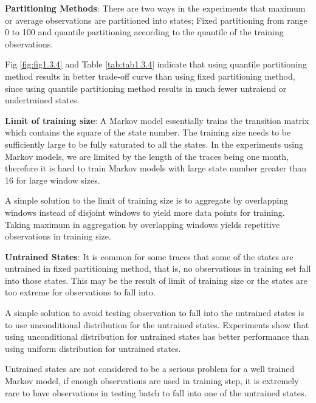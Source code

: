 \documentclass{article}
\begin{document}
\begin{flushleft}
\textbf{Partitioning Methods}: There are two ways in the experiments that
maximum or average observations are partitioned into states; Fixed partitioning
from range 0 to 100 and quantile partitioning according to the quantile of the
training observations. 

Fig \ref{fig:fig1.3.4} and Table \ref{tab:tab1.3.4} indicate that using quantile
partitioning method results in better trade-off curve than using fixed
partitioning method, since using quantile partitioning method results in much
fewer untraiend or undertrained states.
\end{flushleft}

\begin{flushleft}
  \textbf{Limit of training size}: A Markov model essentially trains the
  transition matrix which contains the square of the state number. The training
  size needs to be sufficiently large to be fully saturated to all the states.
  In the experiments using Markov models, we are limited by the length of the
  traces being one month, therefore it is hard to train Markov models with large
  state number greater than 16 for large window sizes.
  
  A simple solution to the limit of training size is to aggregate by overlapping
  windows instead of disjoint windows to yield more data points for training.
  Taking maximum in aggregation by overlapping windows yields repetitive
  observations in training size.
  \end{flushleft}
  
  \begin{flushleft}
  \textbf{Untrained States}: It is common for some traces that some of the
  states are untrained in fixed partitioning method, that is, no observations in
  training set fall into those states. This may be the result of limit of
  training size or the states are too extreme for observations to fall into. 
  
  A simple solution to avoid testing observation to fall into the untrained
  states is to use unconditional distribution for the untrained states.
  Experiments show that using unconditional distribution for untrained states
  has better performance than using uniform distribution for untrained states.
  
  Untrained states are not considered to be a serious problem for a well trained
  Markov model, if enough observations are used in training step, it is
  extremely rare to have observations in testing batch to fall into one of the
  untrained states.
  \end{flushleft}
\end{document}
